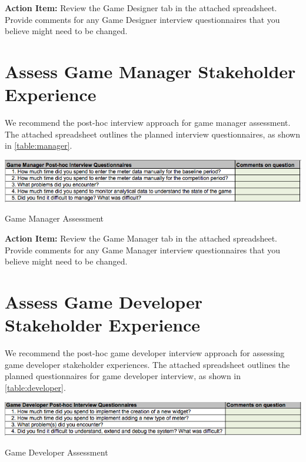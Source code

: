 \documentclass[11pt,oneside]{book}
\begin{document}
\begin{shadebox}
{\bf Action Item:} Review the Game Designer tab in the attached
spreadsheet.  Provide comments for any Game Designer interview questionnaires that
you believe might need to be changed. 
\end{shadebox}

\section{Assess Game Manager Stakeholder Experience}

We recommend the post-hoc interview approach for game manager assessment. The attached spreadsheet outlines the planned interview questionnaires, as shown in \autoref{table:manager}.

\begin{table}[ht!]
  \center
  \includegraphics[width=0.9\columnwidth]{manager}
  \caption{Game Manager Assessment}
  \label{table:manager}
\end{table}


\begin{shadebox}
{\bf Action Item:} Review the Game Manager tab in the attached
spreadsheet.  Provide comments for any Game Manager interview questionnaires that
you believe might need to be changed. 
\end{shadebox}

\section{Assess Game Developer Stakeholder Experience}

We recommend the post-hoc game developer interview approach for assessing game developer stakeholder experiences. The attached spreadsheet outlines the planned questionnaires for game developer interview, as shown in \autoref{table:developer}.

\begin{table}[ht!]
  \center
  \includegraphics[width=0.9\columnwidth]{developer}
  \caption{Game Developer Assessment}
  \label{table:developer}
\end{table}
\end{document}
